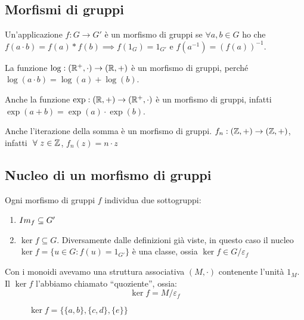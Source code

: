 \subsection{Morfismi di gruppi}

Un'applicazione $f : G \to G'$ \`e un morfismo di gruppi se $\forall a, b \in G$ ho che $f(a \cdot b) = f(a) \ast f(b) \implies f(1_G) = 1_{G'}$ e $f(a^{-1}) = (f(a))^{-1}$.

\begin{exmp} 
La funzione $\log : (\mathbb{R}^{+}, \cdot) \to (\mathbb{R}, +)$ \`e un morfismo di gruppi, perch\'e $\log(a \cdot b) = \log(a) + \log(b)$.

Anche la funzione $\exp : (\mathbb{R}, +) \to (\mathbb{R}^{+}, \cdot)$ \`e un morfismo di gruppi, infatti  $\exp(a + b) = \exp(a) \cdot \exp(b)$.

Anche l'iterazione della somma \`e un morfismo di gruppi. $f_n : (\mathbb{Z}, +) \to (\mathbb{Z}, +) $, infatti $\forall z \in \integers$, $f_n(z) = n \cdot z$
\end{exmp}

\subsection{Nucleo di un morfismo di gruppi}

Ogni morfismo di gruppi $f$ individua due sottogruppi:
\begin{enumerate}
    \item $Im_{f} \subseteq G'$
    \item $\ker f \subseteq G$. Diversamente dalle definizioni gi\`a viste, in questo caso il nucleo $\ker f = \{ u \in G : f(u) = 1_{G'}\}$ \`e una classe, ossia $\ker f \in G / \varepsilon_f$
\end{enumerate}

Con i monoidi avevamo una struttura associativa $(M, \cdot)$ contenente l'unit\`a $1_M$. Il $\ker f$ l'abbiamo chiamato ``quoziente'', ossia:
\[
\ker f = M / \varepsilon_f
\]

\begin{figure}[ht]
\centering
{}
\caption{\label{fig:esempio_funzione}$\ker f = \{ \{a, b \}, \{ c, d \}, \{ e \}\}$ }
\end{figure}

